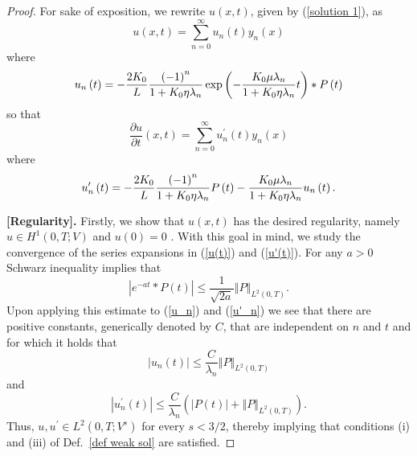 \documentclass[12pt,a4paper]{amsart}
\theoremstyle{definition}
\begin{document}
\begin{proof}
For sake of exposition, we rewrite $u(x,t)$, given by (\ref{solution 1}), as
\begin{equation}
u\left( x,t\right) =\sum_{n=0}^{\infty }u_{n}\left( t\right) y_{n}\left(
x\right)   \label{u(t)}
\end{equation}%
where%
\begin{equation}
u_{n}\left( t\right) =-\frac{2K_{0}}{L}\frac{\left( -1\right) ^{n}}{%
1+K_{0}\eta \lambda _{n}}\exp \left( -\frac{K_{0}\mu \lambda _{n}}{%
1+K_{0}\eta \lambda _{n}}t\right) \ast P\left( t\right)   \label{u_n}
\end{equation}
so that%
\begin{equation}
\frac{\partial u}{\partial t}\left( x,t\right) =\sum_{n=0}^{\infty
}u_{n}^{\prime }\left( t\right) y_{n}\left( x\right)   \label{u'(t)}
\end{equation}
where
\begin{equation}
u_{n}^{\prime }\left( t\right) =-\frac{2K_{0}}{L}\frac{\left( -1\right) ^{n}%
}{1+K_{0}\eta \lambda _{n}}P\left( t\right) -\frac{K_{0}\mu \lambda _{n}}{%
1+K_{0}\eta \lambda _{n}}u_{n}\left( t\right) \label{u'_n}.
\end{equation}

\textbf{[Regularity].} Firstly, we show that $u(x,t)$ has the desired
regularity, namely $u\in H^{1}\left( 0,T;V\right) $ and $u\left( 0\right) =0$%
. With this goal in mind, we study the convergence of the series expansions
in (\ref{u(t)}) and (\ref{u'(t)}). For any $a>0$ Schwarz inequality implies that%
\begin{equation*}
\left\vert e^{-at}\ast P\left( t\right) \right\vert \leq \frac{1}{\sqrt{2a}}%
\left\Vert P\right\Vert _{L^{2}\left( 0,T\right) }.
\end{equation*}
Upon applying this estimate to (\ref{u_n}) and (\ref{u'_n}) we see that there are
positive constants, generically denoted by $C$,
that are independent on $n$ and $t$ and for which it holds that
\begin{equation}
\left\vert u_{n}\left( t\right) \right\vert \leq \frac{C}{\lambda _{n}}%
\left\Vert P\right\Vert _{L^{2}\left( 0,T\right) } \label{estimate u_n}
\end{equation}%
and%
\begin{equation}
\left\vert u_{n}^{\prime }\left( t\right) \right\vert \leq \frac{C}{\lambda
_{n}}\left( \left\vert P\left( t\right) \right\vert +\left\Vert P\right\Vert
_{L^{2}\left( 0,T\right) }\right) .\label{estimate u'_n}
\end{equation}%
Thus, $u,u^{\prime }\in L^{2}\left( 0,T;V^{s}\right) $  for every $s<3/2$,
thereby implying that  conditions (i) and (iii) of Def.~\ref{def weak sol} are satisfied.


\end{proof}
\end{document}
